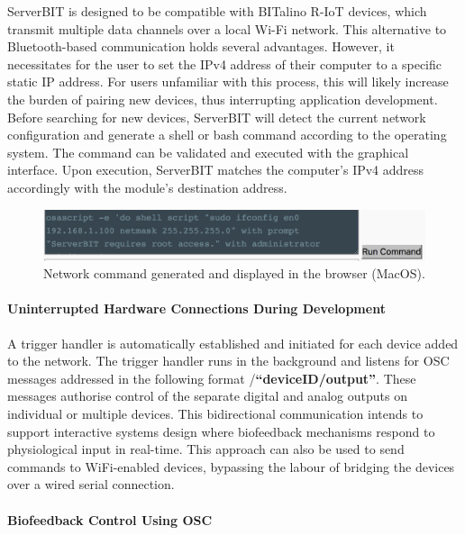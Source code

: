 ServerBIT is designed to be compatible with BITalino R-IoT devices, which transmit multiple data channels over a local Wi-Fi network. This alternative to Bluetooth-based communication holds several advantages. However, it necessitates for the user to set the IPv4 address of their computer to a specific static IP address. For users unfamiliar with this process, this will likely increase the burden of pairing new devices, thus interrupting application development. Before searching for new devices, ServerBIT will detect the current network configuration and generate a shell or bash command according to the operating system. The command can be validated and executed with the graphical interface. Upon execution, ServerBIT matches the computer's IPv4 address accordingly with the module's destination address.

\begin{figure}[ht]
    \centering
    \includegraphics[width=\textwidth]{Chapters/Figures/technical/ServerBIT/ipv4_cmd_osx.png}
    \caption{Network command generated and displayed in the browser (MacOS).}
    \label{fig:cmd_osx}
\end{figure}

\paragraph{Uninterrupted Hardware Connections During Development}

A trigger handler is automatically established and initiated for each device added to the network. The trigger handler runs in the background and listens for OSC messages addressed in the following format /\textbf{``deviceID/output''}. These messages authorise control of the separate digital and analog outputs on individual or multiple devices. This bidirectional communication intends to support interactive systems design where biofeedback mechanisms respond to physiological input in real-time. This approach can also be used to send commands to WiFi-enabled devices, bypassing the labour of bridging the devices over a wired serial connection.

\paragraph{Biofeedback Control Using OSC} \label{Biofeedback}

